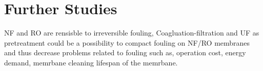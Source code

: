 \chapter{Further Studies}


NF and RO are rensisble to irreversible fouling, Coagluation-filtration and UF as pretreatment could be a possibility to compact fouling on NF/RO membranes and thus decrease problems related to fouling such as, operation cost, energy demand, memrbane cleaning lifespan of the memrbane.  \citep{farahanniRecoveryCoolingTower_2016}

